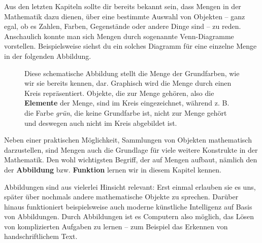 \documentclass[../../main.tex]{subfiles}
\begin{document}
\label{sec:abbildungen_intuition}
Aus den letzten Kapiteln sollte dir bereits bekannt sein, dass Mengen in der Mathematik dazu dienen, über eine bestimmte Auswahl von Objekten -- ganz egal, ob es Zahlen, Farben, Gegenstände oder andere Dinge sind -- zu reden. Anschaulich konnte man sich Mengen durch sogenannte Venn-Diagramme vorstellen. Beispielsweise siehst du ein solches Diagramm für eine einzelne Menge in der folgenden Abbildung.

\begin{figure}[ht]
    \centering
    
    
    \caption{Diese schematische Abbildung stellt die Menge der Grundfarben, wie wir sie bereits kennen, dar. Graphisch wird die Menge durch einen Kreis repräsentiert. Objekte, die zur Menge gehören, also die \textbf{Elemente} der Menge, sind im Kreis eingezeichnet, während z. B. die Farbe \emph{grün}, die keine Grundfarbe ist, nicht zur Menge gehört und deswegen auch nicht im Kreis abgebildet ist.}
    \label{fig:venn_diagram}
\end{figure}

Neben einer praktischen Möglichkeit, Sammlungen von Objekten mathematisch darzustellen, sind Mengen auch die Grundlage für viele weitere Konstrukte in der Mathematik. Den wohl wichtigsten Begriff, der auf Mengen aufbaut, nämlich den der \textbf{Abbildung} bzw. \textbf{Funktion} lernen wir in diesem Kapitel kennen.

Abbildungen sind aus vielerlei Hinsicht relevant: Erst einmal erlauben sie es uns, später über nochmals andere mathematische Objekte zu sprechen. Darüber hinaus funktioniert beispielsweise auch moderne künstliche Intelligenz auf Basis von Abbildungen. Durch Abbildungen ist es Computern also möglich, das Lösen von komplizierten Aufgaben zu lernen -- zum Beispiel das Erkennen von handschriftlichem Text.
\end{document}
